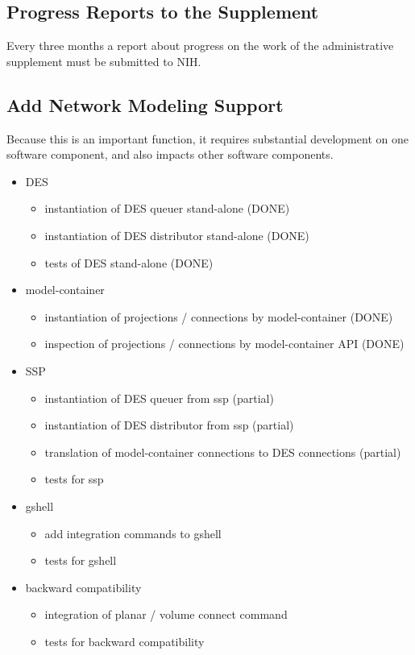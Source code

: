 \documentclass[12pt]{article}
\begin{document}
\subsection{Progress Reports to the Supplement}

Every three months a report about progress on the work of the
administrative supplement must be submitted to NIH.

\subsection{Add Network Modeling Support}

Because this is an important function, it requires substantial
development on one software component, and also impacts other software
components.

\begin{itemize}
\item DES
  \begin{itemize}
  \item instantiation of DES queuer stand-alone (DONE)
  \item instantiation of DES distributor stand-alone (DONE)
  \item tests of DES stand-alone (DONE)
  \end{itemize}
\item model-container
  \begin{itemize}
  \item instantiation of projections / connections by model-container (DONE)
  \item inspection of projections / connections by model-container API (DONE)
  \end{itemize}
\item SSP
  \begin{itemize}
  \item instantiation of DES queuer from ssp (partial)
  \item instantiation of DES distributor from ssp (partial)
  \item translation of model-container connections to DES connections (partial)
  \item tests for ssp
  \end{itemize}
\item gshell
  \begin{itemize}
  \item add integration commands to gshell
  \item tests for gshell
  \end{itemize}
\item backward compatibility
  \begin{itemize}
  \item integration of planar / volume connect command
  \item tests for backward compatibility
  \end{itemize}
\end{itemize}
\end{document}
